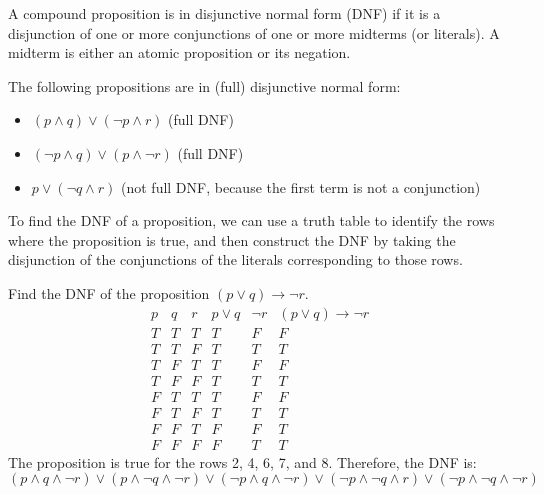 \begin{definition}
    A compound proposition is in disjunctive normal form (DNF) if it is a disjunction of one or more conjunctions of one or more midterms (or literals). A midterm is either an atomic proposition or its negation.
\end{definition}
\begin{eg}
    The following propositions are in (full) disjunctive normal form:
    \begin{itemize}[itemsep=1pt,label=$\circ$]
        \item \((p \land q) \lor (\neg p \land r)\) (full DNF)
        \item \((\neg p \land q) \lor (p \land \neg r)\) (full DNF)
        \item \(p \lor (\neg q \land r)\) (not full DNF, because the first term is not a conjunction)
    \end{itemize}
\end{eg}
To find the DNF of a proposition, we can use a truth table to identify the rows where the proposition is true, and then construct the DNF by taking the disjunction of the conjunctions of the literals corresponding to those rows.
\begin{eg}
    Find the DNF of the proposition $(p \lor q) \to \neg r$.
    \[
        \begin{array}{c|c|c|c|c|c}
            p & q & r & p \lor q & \neg r & (p \lor q) \to \neg r \\
            \hline
            T & T & T & T & F & F \\
            T & T & F & T & T & T \\
            T & F & T & T & F & F \\
            T & F & F & T & T & T \\
            F & T & T & T & F & F \\
            F & T & F & T & T & T \\
            F & F & T & F & F & T \\
            F & F & F & F & T & T
        \end{array}
    \]
    The proposition is true for the rows 2, 4, 6, 7, and 8. Therefore, the DNF is:
    \[ (p \land q \land \neg r) \lor (p \land \neg q \land \neg r) \lor (\neg p \land q \land \neg r) \lor (\neg p \land \neg q \land r) \lor (\neg p \land \neg q \land \neg r) \]
\end{eg}

